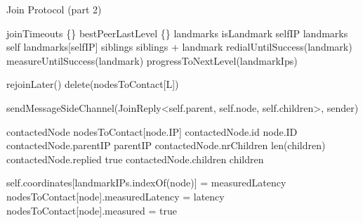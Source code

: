 


\begin{algorithm}
\begin{algorithmic}[1]

\caption{Join Protocol (part 2)}
        \State joinTimeouts \asdassign \{\}
        \State bestPeerLastLevel \asdassign \{\}
        \State landmarks \asdassign []
        \State isLandmark \asdassign selfIP \asdin landmarks
            \State self \asdassign landmarks[selfIP]
                \State siblings \asdassign siblings + landmark
                \State redialUntilSuccess(landmark)
                \State measureUntilSuccess(landmark)
            \EndFor
        \Else 
            \State progressToNextLevel(landmarkIps)
        \EndIf
    \asdend
    
\asdupon[JoinTimeoutTimer(L)]
            \State rejoinLater()
        \Else
            \State delete(nodesToContact[L])
        \EndIf
    \asdend
    
    \State sendMessageSideChannel(JoinReply<self.parent, self.node, self.children>, sender)
\asdend
    
        \State contactedNode \asdassign nodesToContact[node.IP]
        \State contactedNode.id \asdassign node.ID
        \State contactedNode.parentIP \asdassign parentIP
        \State contactedNode.nrChildren \asdassign len(children)
        \State contactedNode.replied \asdassign true
        \State contactedNode.children \asdassign children
    \asdend
   
            \State self.coordinates[landmarkIPs.indexOf(node)] = measuredLatency
        \EndIf
        \State nodesToContact[node].measuredLatency = latency
        \State nodesToContact[node].measured = true
    \asdend
        

\end{algorithmic}
\end{algorithm}
